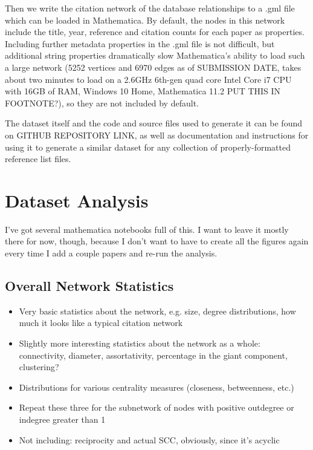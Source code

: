 \documentclass[12pt]{thesis}
\theoremstyle{plain}
\theoremstyle{definition}
\theoremstyle{remark}
\begin{document}
Then we write the citation network of the database relationships to a .gml file which can be loaded in Mathematica. By default, the nodes in this network include the title, year, reference and citation counts for each paper as properties. Including further metadata properties in the .gml file is not difficult, but additional string properties dramatically slow Mathematica's ability to load such a large network (5252 vertices and 6970 edges as of SUBMISSION DATE, takes about two minutes to load on a 2.6GHz 6th-gen quad core Intel Core i7 CPU with 16GB of RAM, Windows 10 Home, Mathematica 11.2 PUT THIS IN FOOTNOTE?), so they are not included by default.

The dataset itself and the code and source files used to generate it can be found on GITHUB REPOSITORY LINK, as well as documentation and instructions for using it to generate a similar dataset for any collection of properly-formatted reference list files.


\section{Dataset Analysis} %

I've got several mathematica notebooks full of this. I want to leave it mostly there for now, though, because I don't want to have to create all the figures again every time I add a couple papers and re-run the analysis.

\subsection{Overall Network Statistics}

\begin{itemize}
\item Very basic statistics about the network, e.g. size, degree distributions, how much it looks like a typical citation network
\item Slightly more interesting statistics about the network as a whole: connectivity, diameter, assortativity, percentage in the giant component, clustering?
\item Distributions for various centrality measures (closeness, betweenness, etc.)
\item Repeat these three for the subnetwork of nodes with positive outdegree or indegree greater than 1
\item Not including: reciprocity and actual SCC, obviously, since it's acyclic
\end{itemize}
\end{document}

